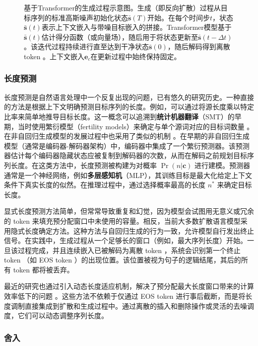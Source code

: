 \documentclass[UTF8,a4paper,zihao=-4,oneside,openany]{ctexbook}
\makeatletter
\newcommand{\AMLFigure}[2][0.96\linewidth]{%
  \begingroup
  \let\AtBeginDocument\@gobble
  \endgroup
}
\makeatother
\begin{document}
\begin{figure}[!t]
\centering
\AMLFigure{figure-transformer-based-generation-process}
\caption{基于Transformer的生成过程示意图。生成（即反向扩散）过程从目标序列的标准高斯噪声初始化状态$\bar{\mathbf{s}}(T)$开始。在每个时间步$t$，状态$\bar{\mathbf{s}}(t)$表示上下文嵌入与带噪目标嵌入的拼接。Transformer模型基于$\bar{\mathbf{s}}(t)$估计得分函数（或向量场），随后用于将状态更新至$\bar{\mathbf{s}}(t-\Delta t)$。该迭代过程持续进行直至达到干净状态$\bar{\mathbf{s}}(0)$，随后解码得到离散 token 。上下文嵌入$\mathbf{e}_c$在更新过程中始终保持固定。}
\label{fig:transformer-based-generation-process}
\end{figure}
\subsubsection{长度预测}

长度预测是自然语言处理中一个反复出现的问题，已有悠久的研究历史。一种直接的方法是根据上下文明确预测目标序列的长度。例如，可以通过将源长度乘以特定比率来简单地推导目标长度。这一概念可以追溯到\textbf{统计机器翻译}（SMT）的早期，当时使用繁衍模型（fertility
models）来确定与单个源词对应的目标词数量 \citep{brown-etal:1993mathematics}。在非自回归生成模型的发展过程中也采用了类似的机制 \citep{xiao-etal:2023survey}。在早期的非自回归生成模型（通常是编码器-解码器架构）中，编码器中集成了一个繁衍预测器。该预测器估计每个编码器隐藏状态应被复制到解码器的次数，从而在解码之前规划目标序列长度。在这类方法中，长度预测被构建为对概率 $\Pr(n|\mathbf{c})$ 进行建模。预测器通常是一个神经网络，例如\textbf{多层感知机}（MLP），其训练目标是最大化给定上下文条件下真实长度的似然。在推理过程中，通过选择概率最高的长度 $n^*$ 来确定目标长度。

显式长度预测方法简单，但常常导致重复和幻觉，因为模型会试图用无意义或冗余的 token 来填充预分配窗口中未使用的容量。相反，当前大多数扩散语言模型采用隐式长度确定方法。这种方法与自回归生成的行为一致，允许模型自行发出终止信号。在实践中，生成过程从一个足够长的窗口（例如，最大序列长度）开始。一旦该过程完成，并且连续嵌入已被解码为离散 token ，系统会识别第一个终止 token （如 EOS token ）的出现位置。该位置被视为句子的逻辑结尾，其后的所有 token 都将被丢弃。

最近的研究也通过引入动态长度适应机制，解决了预分配最大长度窗口带来的计算效率低下的问题 \citep{li-etal:2025fixed,yang-etal:2025diffusion}。这些方法不依赖于仅通过 EOS token 进行事后截断，而是将长度调制直接集成到扩散和生成过程中。通过离散的插入和删除操作或灵活的去噪调度，它们可以动态调整序列长度。
\subsubsection{舍入}
\end{document}
